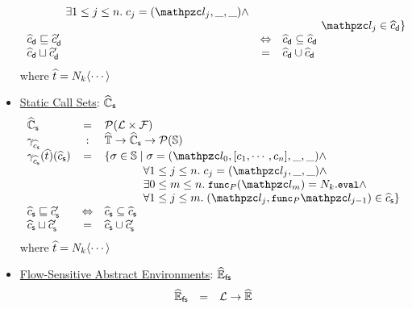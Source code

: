 \begin{itemize}
\[\begin{array}{lcl}
          \phantom{\{ \st \in \stset \mid}
          \exists 1 \leq j \leq n. \; \ctxt_j = (\lab_j, \_, \_) \wedge\\&&

          \phantom{\{ \st \in \stset \mid}
          \lab_j \in \adcall
        \}\\

        \adcall \order \adcall' &\Leftrightarrow&
        \adcall \subseteq \adcall\\

        \adcall \join \adcall' &=&
        \adcall \cup \adcall\\
      \end{array}
    \]
    where $\widehat{t} = N_k \langle \cdots \rangle$

  \item \underline{Static Call Sets}: $\widehat{\mathbb{C}}_{\textsf{s}}$
    \[
      \begin{array}{lcl}
        \ascallset &=& \powerset{\labset \times \funcset}\\

        \ascallgamma &:& \atreeset \rightarrow \ascallset \rightarrow
        \powerset{\stset}\\

        \ascallgamma(\atree)(\ascall) &=& \{ \st \in \stset \mid
          \st = (\lab_0, [\ctxt_1, \cdots, \ctxt_n], \_, \_) \wedge\\&&

          \phantom{\{ \st \in \stset \mid}
          \forall 1 \leq j \leq n. \; \ctxt_j = (\lab_j, \_, \_) \wedge\\&&

          \phantom{\{ \st \in \stset \mid}
          \exists 0 \leq m \leq n. \; \getfunc{\prog}(\lab_m) = \nt_k.\eval
          \wedge\\&&

          \phantom{\{ \st \in \stset \mid}
          \forall 1 \leq j \leq m. \; (\lab_j, \getfunc{\prog}{\lab_{j-1}}) \in
          \ascall
        \}\\

        \ascall \order \ascall' &\Leftrightarrow& \ascall \subseteq \ascall\\

        \ascall \join \ascall' &=& \ascall \cup \ascall'\\
      \end{array}
    \]
    where $\widehat{t} = N_k \langle \cdots \rangle$

  \item \underline{Flow-Sensitive Abstract Environments}: $\widehat{\mathbb{E}}_{\textsf{fs}}$
    \[
      \begin{array}{lcl}
        \widehat{\mathbb{E}}_{\textsf{fs}} &=& \mathcal{L} \rightarrow \widehat{\mathbb{E}}\\


\end{array}\]
\end{itemize}
